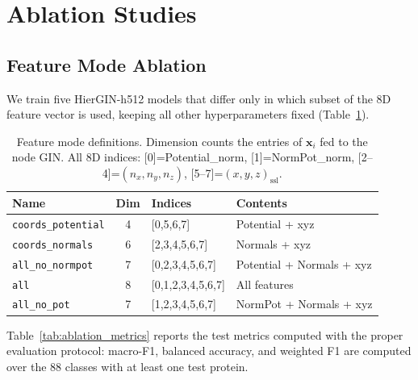 \section{Ablation Studies}
\label{sec:ablation}

\subsection{Feature Mode Ablation}
\label{sec:ablation:features}

We train five HierGIN-h512 models that differ only in which subset of the
8D feature vector is used, keeping all other hyperparameters fixed
(Table~\ref{tab:feature_modes}).

\begin{table}[h]
  \centering
  \caption{Feature mode definitions. Dimension counts the entries of
           $\mathbf{x}_i$ fed to the node GIN. All 8D indices:
           [0]=Potential\_norm, [1]=NormPot\_norm, [2--4]=$(n_x,n_y,n_z)$,
           [5--7]=$(x,y,z)_\text{ssl}$.}
  \label{tab:feature_modes}
  \begin{tabular}{lclp{5.5cm}}
    \toprule
    \textbf{Name} & \textbf{Dim} & \textbf{Indices} & \textbf{Contents} \\
    \midrule
    \texttt{coords\_potential}  & 4  & [0,5,6,7] & Potential + xyz \\
    \texttt{coords\_normals}    & 6  & [2,3,4,5,6,7] & Normals + xyz \\
    \texttt{all\_no\_normpot}   & 7  & [0,2,3,4,5,6,7] & Potential + Normals + xyz \\
    \texttt{all}                & 8  & [0,1,2,3,4,5,6,7] & All features \\
    \texttt{all\_no\_pot}       & 7  & [1,2,3,4,5,6,7] & NormPot + Normals + xyz \\
    \bottomrule
  \end{tabular}
\end{table}

Table~\ref{tab:ablation_metrics} reports the test metrics computed with the
proper evaluation protocol: macro-F1, balanced accuracy, and weighted F1 are
computed over the 88 classes with at least one test protein.

